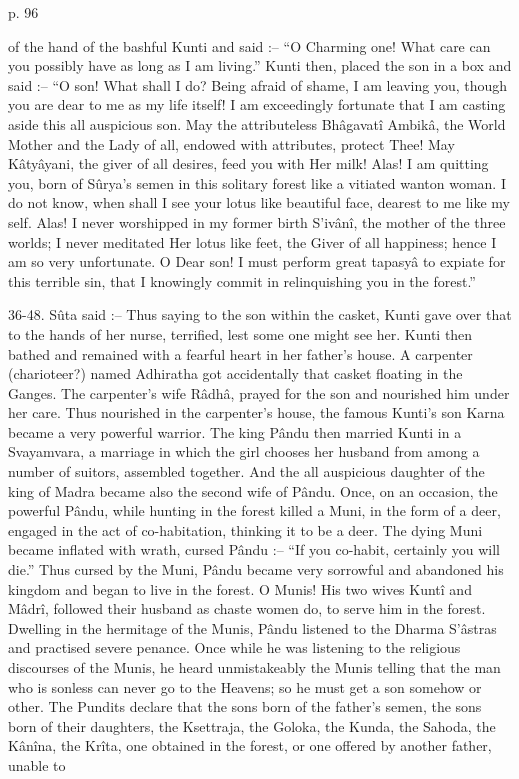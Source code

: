  

p. 96

 

of the hand of the bashful Kunti and said :-- “O Charming one! What care can you possibly have as            long as I am living.” Kunti then, placed the son in a box and said :-- “O son! What shall I do? Being afraid of shame, I am leaving you, though you are dear to me as my life itself! I am exceedingly fortunate that I am casting aside this all auspicious son. May the attributeless Bhâgavatî Ambikâ, the World Mother and the Lady of all, endowed with attributes, protect Thee! May Kâtyâyani, the giver of all desires, feed you with Her milk! Alas! I am quitting you, born of Sûrya’s semen in this solitary forest like a vitiated wanton woman. I do not know, when shall I see your lotus like beautiful face, dearest to me like my self. Alas! I never worshipped in my former birth S’ivânî, the mother of the three worlds; I never meditated Her lotus like feet, the Giver of all happiness; hence I am so very unfortunate. O Dear son! I must perform great tapasyâ to expiate for this terrible sin, that I knowingly commit in relinquishing you in the forest.”

 

36-48. Sûta said :-- Thus saying to the son within the casket, Kunti gave over that to the hands of her nurse, terrified, lest some one might see her. Kunti then bathed and remained with a fearful heart in her father's house. A carpenter (charioteer?) named Adhiratha got accidentally that casket floating in the Ganges. The carpenter's wife Râdhâ, prayed for the son and nourished him under her care. Thus nourished in the carpenter's house, the famous Kunti's son Karna became a very powerful warrior. The king Pându then married Kunti in a Svayamvara, a marriage in which the girl chooses her husband from among a number of suitors, assembled together. And the all auspicious daughter of the king of Madra became also the second wife of Pându. Once, on an occasion, the powerful Pându, while hunting in the forest killed a Muni, in the form of a deer, engaged in the act of co-habitation, thinking it to be a deer. The dying Muni became inflated with wrath, cursed Pându :-- “If you co-habit, certainly you will die.” Thus cursed by the Muni, Pându became very sorrowful and abandoned his kingdom and began to live in the forest. O Munis! His two wives Kuntî and Mâdrî, followed their husband as chaste women do, to serve him in the forest. Dwelling in the hermitage of the Munis, Pându listened to the Dharma S’âstras and practised severe penance. Once while he was listening to the religious discourses of the Munis, he heard unmistakeably the Munis telling that the man who is sonless can never go to the Heavens; so he must get a son somehow or other. The Pundits declare that the sons born of the father's semen, the sons born of their daughters, the Ksettraja, the Goloka, the Kunda, the Sahoda, the Kânîna, the Krîta, one obtained in the forest, or one offered by another father, unable to

